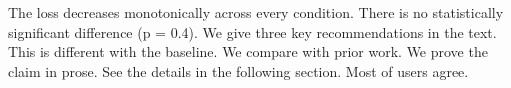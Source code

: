 \documentclass{article}
\begin{document}
\begin{abstract}
We are the first to show this. The values are 1, 2, 3, 4, 5 and 6 in one sentence here.
\end{abstract}
The loss decreases monotonically across every condition.
There is no statistically significant difference (p = 0.4).
We give three key recommendations in the text.
This is different with the baseline.
We compare with prior work.
We prove the claim in prose.
See the details in the following section.
Most of users agree.
\end{document}
